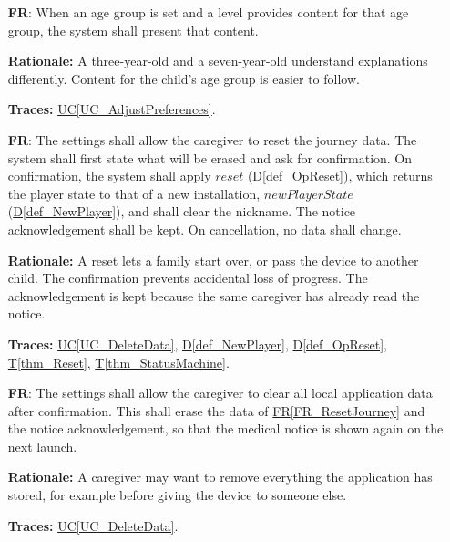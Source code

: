 \documentclass[12pt]{article}
\newcommand{\ucref}[1]{\hyperref[#1]{UC\ref*{#1}}}
\newcounter{reqnum} %
\newcommand{\rref}[1]{\hyperref[#1]{FR\ref*{#1}}}
\newcommand{\thmref}[1]{\hyperref[#1]{T\ref*{#1}}}
\newcommand{\defref}[1]{\hyperref[#1]{D\ref*{#1}}}
\newcommand{\haurl}{https://team-hindsight.github.io/ophthamology-game/HazardAnalysis/HazardAnalysis.pdf}
\newcommand{\hasrref}[2]{\href{\haurl\#nameddest=sr:#1}{SR-#2}}
\newcommand{\hahazref}[2]{\href{\haurl\#nameddest=haz:#1}{H#2}}
\newcommand{\hazsr}[4]{\hasrref{#1}{#2} (\hahazref{#3}{#4})}
\begin{document}
\begin{itemize}
\textbf{Rationale:} Caregivers know what their child needs, such as a lower
volume in a waiting room. Applying changes immediately lets the caregiver see
the result before handing the device back.

\textbf{Traces:} \ucref{UC_AdjustPreferences}.

\textbf{Hazard Analysis:} \hazsr{SafeAudioVisuals}{14}{UnsafeAudioVisuals}{2-14}, \hazsr{VisualCuesSetting}{19}{VisualCuesDisabledSetting}{2-13}.

\item[\refstepcounter{reqnum}\textbf{FR\thereqnum}\label{FR_AgeGroup}:]
When an age group is set and a level provides content for that age group, the
system shall present that content.

\textbf{Rationale:} A three-year-old and a seven-year-old understand
explanations differently. Content for the child's age group is easier to
follow.

\textbf{Traces:} \ucref{UC_AdjustPreferences}.

\item[\refstepcounter{reqnum}\textbf{FR\thereqnum}\label{FR_ResetJourney}:]
The settings shall allow the caregiver to reset the journey data. The system
shall first state what will be erased and ask for confirmation. On
confirmation, the system shall apply $\mathit{reset}$ (\defref{def_OpReset}),
which returns the player state to that of a new installation,
$\mathit{newPlayerState}$ (\defref{def_NewPlayer}), and shall clear the
nickname. The notice acknowledgement shall be kept. On cancellation, no data
shall change.

\textbf{Rationale:} A reset lets a family start over, or pass the device to
another child. The confirmation prevents accidental loss of progress. The
acknowledgement is kept because the same caregiver has already read the
notice.

\textbf{Traces:} \ucref{UC_DeleteData}, \defref{def_NewPlayer},
\defref{def_OpReset}, \thmref{thm_Reset}, \thmref{thm_StatusMachine}.

\item[\refstepcounter{reqnum}\textbf{FR\thereqnum}\label{FR_ClearAllData}:]
The settings shall allow the caregiver to clear all local application data
after confirmation. This shall erase the data of \rref{FR_ResetJourney} and the
notice acknowledgement, so that the medical notice is shown again on the next
launch.

\textbf{Rationale:} A caregiver may want to remove everything the application
has stored, for example before giving the device to someone else.

\textbf{Traces:} \ucref{UC_DeleteData}.

\end{itemize}
\end{document}
